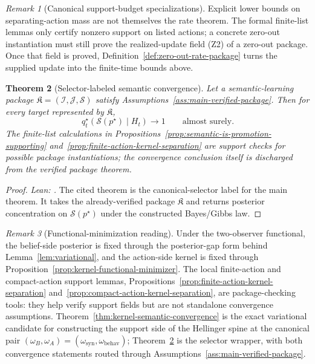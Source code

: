 \documentclass[11pt]{article}
\newtheorem{theorem}{Theorem}[section]
\theoremstyle{definition}
\theoremstyle{remark}
\newtheorem{remark}[theorem]{Remark}
\theoremstyle{plain}
\theoremstyle{definition}
\newcommand{\Scal}{\mathcal{S}}
\begin{document}
\begin{remark}[Canonical support-budget specializations]
\label{rem:canonical-support-budgets}
Explicit lower bounds on separating-action mass are not themselves the rate theorem. The formal finite-list lemmas only certify nonzero support on listed actions; a concrete zero-out instantiation must still prove the realized-update field \textup{(Z2)} of a zero-out package. Once that field is proved, Definition~\ref{def:zero-out-rate-package} turns the supplied update into the finite-time bounds above.
\end{remark}

\begin{theorem}[Selector-labeled semantic convergence]
\label{thm:semantic-convergence}
Let a semantic-learning package $\mathfrak K=(\mathcal I,\mathcal J,\Scal)$ satisfy Assumptions~\ref{ass:main-verified-package}. Then for every target represented by $\mathfrak K$,
\[
q_t^\star(\Scal(p^\star)\mid H_t)\longrightarrow 1
\qquad
\text{almost surely.}
\]
The finite-list calculations in Propositions~\ref{prop:semantic-is-promotion-supporting} and~\ref{prop:finite-action-kernel-separation} are support checks for possible package instantiations; the convergence conclusion itself is discharged from the verified package theorem.
\end{theorem}

\begin{proof}
\noindent\emph{Lean: .}
The cited theorem is the canonical-selector label for the main theorem. It takes the already-verified package $\mathfrak K$ and returns posterior concentration on $\Scal(p^\star)$ under the constructed Bayes/Gibbs law.
\end{proof}

\begin{remark}[Functional-minimization reading]
\label{rem:functional-payoff}
Under the two-observer functional, the belief-side posterior is fixed through the posterior-gap form behind Lemma~\ref{lem:variational}, and the action-side kernel is fixed through Proposition~\ref{prop:kernel-functional-minimizer}. The local finite-action and compact-action support lemmas, Propositions~\ref{prop:finite-action-kernel-separation} and~\ref{prop:compact-action-kernel-separation}, are package-checking tools: they help verify support fields but are not standalone convergence assumptions. Theorem~\ref{thm:kernel-semantic-convergence} is the exact variational candidate for constructing the support side of the Hellinger spine at the canonical pair $(\omega_B,\omega_A)=(\omega_{\mathrm{syn}},\omega_{\mathrm{behav}})$; Theorem~\ref{thm:semantic-convergence} is the selector wrapper, with both convergence statements routed through Assumptions~\ref{ass:main-verified-package}.
\end{remark}
\end{document}
